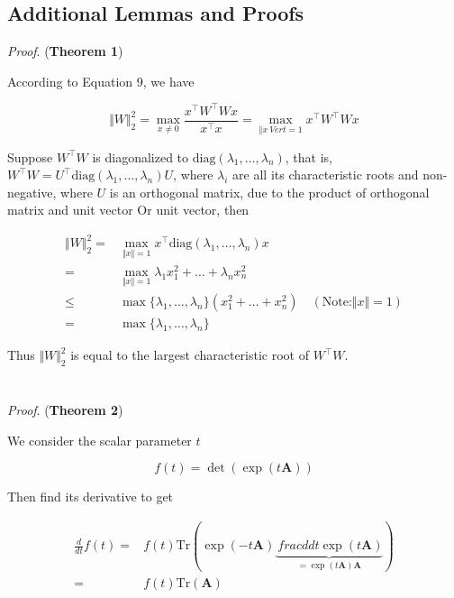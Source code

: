 \documentclass[final]{cvpr}
\begin{document}
\clearpage
\begin {appendix}
\section{Additional Lemmas and Proofs}
\label{app1}
\noindent\emph{Proof}. (\textbf{Theorem 1})

According to Equation 9, we have

\begin{equation}
\Vert W\Vert_2^2 = \max_{x\neq 0}\frac{x^{\top}W^{\top} Wx}{x^{\top} x} = \max_{\Vert x\ Vert=1}x^{\top}W^{\top} Wx
\end{equation}

Suppose $W^{\top} W$ is diagonalized to $\text{diag}(\lambda_1,\dots,\lambda_n)$, that is, $W^{\top} W=U^{\top}\text {diag}(\lambda_1,\dots,\lambda_n)U$, where $\lambda_i$ are all its characteristic roots and non-negative, where $U$ is an orthogonal matrix, due to the product of orthogonal matrix and unit vector Or unit vector, then

\begin{equation}
\begin{aligned}\Vert W\Vert_2^2 =& \max_{\Vert x\Vert=1}x^{\top}\text{diag}(\lambda_1,\dots,\lambda_n) x \\
=& \max_{\Vert x\Vert=1} \lambda_1 x_1^2 + \dots + \lambda_n x_n^2\\
\leq & \max\{\lambda_1,\dots,\lambda_n\} (x_1^2 + \dots + x_n^2)\quad(\text{Note:}\Vert x\Vert=1)\\
=&\max\{\lambda_1,\dots,\lambda_n\}\end{aligned}
\end{equation}

Thus $\Vert W\Vert_2^2$ is equal to the largest characteristic root of $W^{\top} W$.
\\
\\
\\
\noindent\emph{Proof}. (\textbf{Theorem 2})

We consider the scalar parameter $t$

\begin{equation}f(t)=\det(\exp(t\boldsymbol{A}))\end{equation}

Then find its derivative to get

\begin{equation}\begin{aligned}\frac{d}{dt}f(t)=&f(t)\text{Tr}\left(\exp(-t\boldsymbol{A})\underbrace{\ frac{d}{dt}\exp(t\boldsymbol{A})}_{=\exp(t\boldsymbol{A})\boldsymbol{A}}\right)\\
=&f(t)\text{Tr}(\boldsymbol{A})\end{aligned}\end{equation}


\end{appendix}
\end{document}
